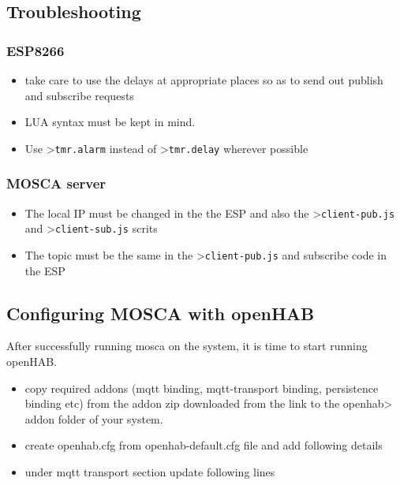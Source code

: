 \documentclass[16pt]{article}
\begin{document}
\subsection{Troubleshooting}


\subsubsection{ESP8266}

\begin{itemize}

\item
  take care to use the delays at appropriate places so as to send out
  publish and subscribe requests
\item
  LUA syntax must be kept in mind.
\item
  Use \textgreater{}\texttt{tmr.alarm} instead of
  \textgreater{}\texttt{tmr.delay} wherever possible
\end{itemize}

\vspace{0.6cm}

\subsubsection{MOSCA server}

\begin{itemize}

\item
  The local IP must be changed in the the ESP and also the
  \textgreater{}\texttt{client-pub.js} and
  \textgreater{}\texttt{client-sub.js} scrits
\item
  The topic must be the same in the \textgreater{}\texttt{client-pub.js}
  and subscribe code in the ESP
\end{itemize}

\vspace{0.5cm}


\subsection{Configuring MOSCA with
openHAB}


After successfully running mosca on the system, it is time to start
running openHAB.

\begin{itemize}

\item
  copy required addons (mqtt binding, mqtt-transport binding,
  persistence binding etc) from the addon zip downloaded from the
  link to the openhab\textgreater{} addon folder of your system.
\item
  create openhab.cfg from openhab-default.cfg file and add following
  details
\item
  under mqtt transport section update following lines
\end{itemize}
\end{document}
